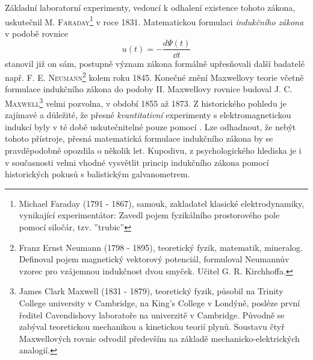     Základní laboratorní experimenty, vedoucí k odhalení existence tohoto zákona, uskutečnil 
    \textsc{M. Faraday}\footnote{Michael Faraday (1791 - 1867), samouk, zakladatel klasické 
    elektrodynamiky, vynikající experimentátor: Zavedl pojem fyzikálního prostorového pole pomocí 
    siločár, tzv. ''trubic''} v roce 1831. Matematickou formulaci \emph{indukčního zákona} v podobě 
    rovnice
    \begin{equation}\label{TEO:eq102}
      u(t) = - \frac{d\Psi(t)}{\dd{t}}
    \end{equation} 
    stanovil již on sám, postupně význam zákona formálně upřesňovali další badatelé např. \textsc{F.
    E. Neumann}\footnote{Franz Ernst Neumann (1798 - 1895), teoretický fyzik, matematik, mineralog.
    Definoval pojem magnetický vektorový potenciál, formuloval Neumannův vzorec pro vzájemnou
    indukčnost dvou smyček. Učitel G. R. Kirchhoffa.} kolem roku 1845. Konečné znění Maxwellovy
    teorie včetně formulace indukčního zákona do podoby II. Maxwellovy rovnice budoval \textsc{J. C.
    Maxwell}\footnote{James Clark Maxwell (1831 - 1879), teoretický fyzik, působil na Trinity
    College university v Cambridge, na King's College v Londýně, posléze první ředitel Cavendishovy
    laboratoře na univerzitě v Cambridge. Původně se zabýval teoretickou mechanikou a kinetickou
    teorií plynů. Soustavu čtyř Maxwellových rovnic odvodil především na základě
    mechanicko-elektrických analogií.} velmi pozvolna, v období 1855 až 1873. Z historického pohledu
    je zajímavé a důležité, že přesné \emph{kvantitativní} experimenty s elektromagnetickou indukcí
    byly v té době uskutečnitelné pouze pomocí \wikiGalvanometer. Lze odhadnout, že nebýt tohoto
    přístroje, přesná matematická formulace indukčního zákona by se pravděpodobně opozdila o několik
    let. Kupodivu, z psychologického hlediska je i v současnosti velmi vhodné vysvětlit princip
    indukčního zákona pomocí historických pokusů s balistickým galvanometrem.
    
